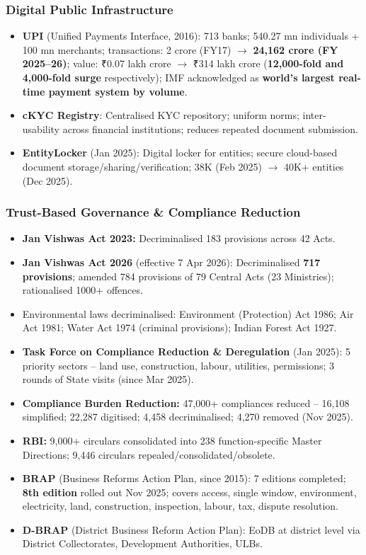 \subsubsection*{Digital Public Infrastructure}
\begin{itemize}
  \item \textbf{UPI} (Unified Payments Interface, 2016): 713 banks; 540.27 mn individuals + 100 mn merchants; transactions: 2 crore (FY17) $\rightarrow$ \textbf{24,162 crore (FY 2025--26)}; value: ₹0.07 lakh crore $\rightarrow$ ₹314 lakh crore (\textbf{12,000-fold and 4,000-fold surge} respectively); IMF acknowledged as \textbf{world's largest real-time payment system by volume}.
  \item \textbf{cKYC Registry}: Centralised KYC repository; uniform norms; inter-usability across financial institutions; reduces repeated document submission.
  \item \textbf{EntityLocker} (Jan 2025): Digital locker for entities; secure cloud-based document storage/sharing/verification; 38K (Feb 2025) $\rightarrow$ 40K+ entities (Dec 2025).
\end{itemize}

\subsubsection*{Trust-Based Governance \& Compliance Reduction}
\begin{itemize}
  \item \textbf{Jan Vishwas Act 2023:} Decriminalised 183 provisions across 42 Acts.
  \item \textbf{Jan Vishwas Act 2026} (effective 7 Apr 2026): Decriminalised \textbf{717 provisions}; amended 784 provisions of 79 Central Acts (23 Ministries); rationalised 1000+ offences.
  \item Environmental laws decriminalised: Environment (Protection) Act 1986; Air Act 1981; Water Act 1974 (criminal provisions); Indian Forest Act 1927.
  \item \textbf{Task Force on Compliance Reduction \& Deregulation} (Jan 2025): 5 priority sectors -- land use, construction, labour, utilities, permissions; 3 rounds of State visits (since Mar 2025).
  \item \textbf{Compliance Burden Reduction:} 47,000+ compliances reduced -- 16,108 simplified; 22,287 digitised; 4,458 decriminalised; 4,270 removed (Nov 2025).
  \item \textbf{RBI:} 9,000+ circulars consolidated into 238 function-specific Master Directions; 9,446 circulars repealed/consolidated/obsolete.
  \item \textbf{BRAP} (Business Reforms Action Plan, since 2015): 7 editions completed; \textbf{8th edition} rolled out Nov 2025; covers access, single window, environment, electricity, land, construction, inspection, labour, tax, dispute resolution.
  \item \textbf{D-BRAP} (District Business Reform Action Plan): EoDB at district level via District Collectorates, Development Authorities, ULBs.
\end{itemize}

